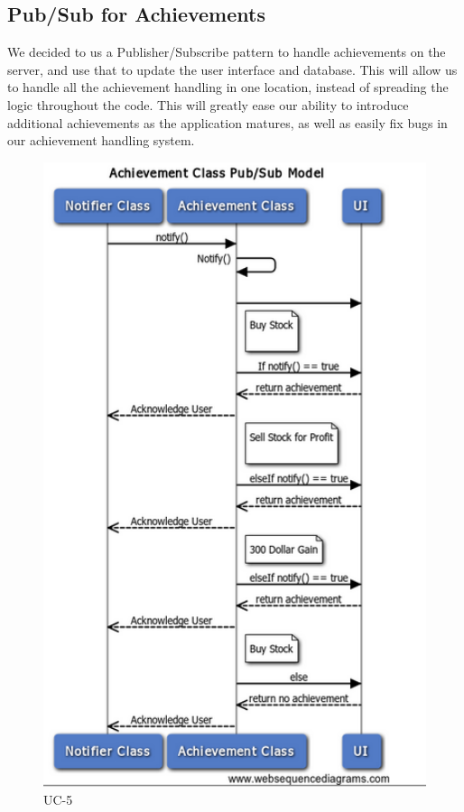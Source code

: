 \subsection{Pub/Sub for Achievements}
We decided to us a Publisher/Subscribe pattern to handle achievements on the
server, and use that to update the user interface and database.  This will
allow us to handle all the achievement handling in one location, instead of
spreading the logic throughout the code.  This will greatly ease our ability
to introduce additional achievements as the application matures, as well as
easily fix bugs in our achievement handling system.

\begin{figure}[H]
\centering
\includegraphics[width=5.5in]{./img/inter/PubSub.png}
\caption{UC-5}
\end{figure}


